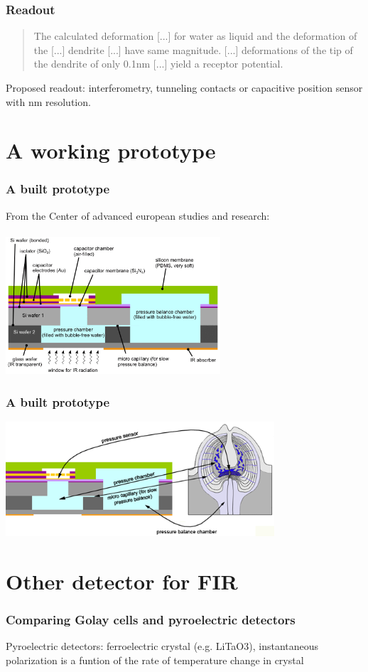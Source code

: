 \documentclass[14pt]{beamer}
\begin{document}
\begin{frame}
\frametitle{Readout}
\begin{quote}
The calculated deformation [...] for water as liquid and the deformation of the [...] dendrite [...] have same magnitude. [...] deformations of the tip of the dendrite of only 0.1nm [...] yield a receptor potential. 
\end{quote}
Proposed readout: interferometry, tunneling contacts or capacitive position sensor with nm resolution.
\end{frame}

\section{A working prototype}
\begin{frame}
\frametitle{A built prototype}
From the Center of advanced european studies and research:\\
~\\
\includegraphics[width=8cm]{IR_sensor_abb_4_02.png}
\end{frame}
\begin{frame}
\frametitle{A built prototype}
\includegraphics[width=10cm]{IR_sensor_abb_5_02.png}
\end{frame}

\section{Other detector for FIR}
\begin{frame}
\frametitle{Comparing Golay cells and pyroelectric detectors}
Pyroelectric detectors: ferroelectric crystal (e.g. LiTaO3), instantaneous polarization is a funtion of the rate of temperature change in crystal

\end{frame}
\end{document}
